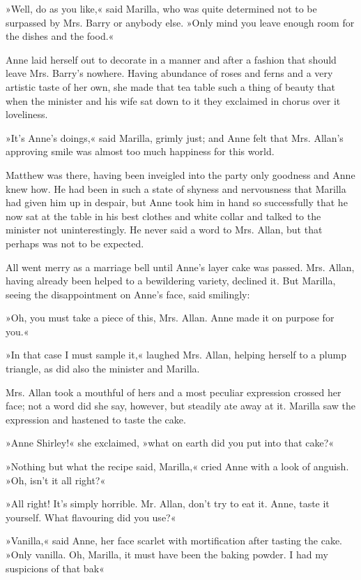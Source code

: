 »Well, do as you like,« said Marilla, who was quite determined not to be surpassed by Mrs. Barry or anybody else. »Only mind you leave enough room for the dishes and the food.«

Anne laid herself out to decorate in a manner and after a fashion that should leave Mrs. Barry's nowhere. Having abundance of roses and ferns and a very artistic taste of her own, she made that tea table such a thing of beauty that when the minister and his wife sat down to it they exclaimed in chorus over it loveliness.

»It's Anne's doings,« said Marilla, grimly just; and Anne felt that Mrs. Allan's approving smile was almost too much happiness for this world.

Matthew was there, having been inveigled into the party only goodness and Anne knew how. He had been in such a state of shyness and nervousness that Marilla had given him up in despair, but Anne took him in hand so successfully that he now sat at the table in his best clothes and white collar and talked to the minister not uninterestingly. He never said a word to Mrs. Allan, but that perhaps was not to be expected.

All went merry as a marriage bell until Anne's layer cake was passed. Mrs. Allan, having already been helped to a bewildering variety, declined it. But Marilla, seeing the disappointment on Anne's face, said smilingly:

»Oh, you must take a piece of this, Mrs. Allan. Anne made it on purpose for you.«

»In that case I must sample it,« laughed Mrs. Allan, helping herself to a plump triangle, as did also the minister and Marilla.

Mrs. Allan took a mouthful of hers and a most peculiar expression crossed her face; not a word did she say, however, but steadily ate away at it. Marilla saw the expression and hastened to taste the cake.

»Anne Shirley!« she exclaimed, »what on earth did you put into that cake?«

»Nothing but what the recipe said, Marilla,« cried Anne with a look of anguish. »Oh, isn't it all right?«

»All right! It's simply horrible. Mr. Allan, don't try to eat it. Anne, taste it yourself. What flavouring did you use?«

»Vanilla,« said Anne, her face scarlet with mortification after tasting the cake. »Only vanilla. Oh, Marilla, it must have been the baking powder. I had my suspicions of that bak\longdash«

